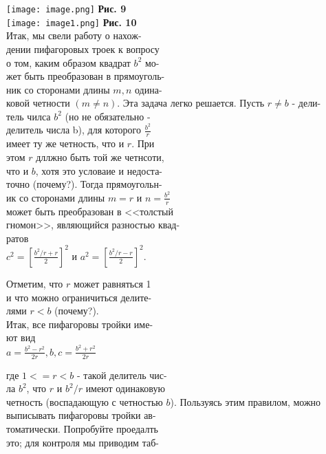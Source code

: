 \documentclass[11pt]{article}
\begin{document}
\pagecolor[rgb]{1, 1, 0.95}
\noindent
\sffamily 

\begin{minipage}{0.5\textwidth}
  \begin{flushleft}
    \texttt{[image: image.png]} 
    \textbf{Рис. 9} \\
    \vspace{5mm}
    \texttt{[image: image1.png]}
    \textbf{Рис. 10} \\
    \vspace{5mm}
        \leftskip=0.6cm
        Итак, мы свели работу о нахож-\\
        \leftskip=0cm
        дении пифагоровых троек к вопросу\\о том, каким образом квадрат $b^2$ мо-\\
        жет быть преобразован в прямоуголь-\\
        ник со сторонами длины $m, n$ одина-\\ковой четности $(m\not =n)$. Эта задача легко решается. Пусть $r\not = b$ - дели-\\тель чилса $b^2$ (но не обязательно -\\ делитель числа b), для которого $\frac{b^2}{r}$\\ имеет ту же четность, что и $r$. При\\этом $r$ дллжно быть той же четнсоти,\\что и $b$, хотя это условаие и недоста-\\точно (почему?). Тогда прямоугольн-\\ик со сторонами длины $m=r$ и $n=\frac{b^2}{r}$\\может быть преобразован в <<толстый\\гномон>>, являющийся разностью квад-\\ратов\\
        \centering $c^2=[\frac{b^2/r+r}{2}]^2$ и $a^2=[\frac{b^2/r-r}{2}]^2$.\\
        \raggedright
        Отметим, что $r$ может равняться 1\\и что можно ограничиться делите-\\лями $r<b$ (почему?).\\
        \leftskip=0.6cm
        Итак, все пифагоровы тройки име-\\
        \leftskip=0cm
        ют вид\\
        \centering $a=\frac{b^2-r^2}{2r}, b, c=\frac{b^2+r^2}{2r}$\\
        \raggedright где $1<=r<b$ - такой делитель чис-\\ла $b^2$, что $r$ и $b^2/r$ имеют одинаковую\\четность (воспадающую с четностью $b$).
        Пользуясь этим правилом, можно\\выписывать пифагоровы тройки ав-\\томатически. Попробуйте проедалть\\это; для контроля мы приводим таб-\\
  \end{flushleft}
\end{minipage}
\end{document}
